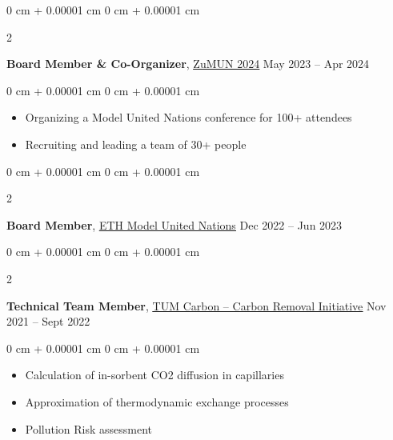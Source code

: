 \documentclass[10pt, letterpaper]{article}
\newenvironment{highlights}{
    \begin{itemize}[
        topsep=0.10 cm,
        parsep=0.10 cm,
        partopsep=0pt,
        itemsep=0pt,
        leftmargin=0 cm + 10pt
    ]
}{
    \end{itemize}
} %
\newenvironment{onecolentry}{
    \begin{adjustwidth}{
        0 cm + 0.00001 cm
    }{
        0 cm + 0.00001 cm
    }
}{
    \end{adjustwidth}
} %
\newenvironment{twocolentry}[2][]{
    \onecolentry
    \def\secondColumn{#2}
    \setcolumnwidth{\fill, 4.5 cm}
    \begin{paracol}{2}
}{
    \switchcolumn \raggedleft \secondColumn
    \end{paracol}
    \endonecolentry
} %
\begin{document}
         \vspace{0.2 cm}


         
        \begin{twocolentry}{
            May 2023 – Apr 2024
        }
            \textbf{Board Member \& Co-Organizer}, \href{https://zumun.ch/secretariat/}{\underline{ZuMUN 2024}}\end{twocolentry}
            \vspace{0.10 cm}
        \begin{onecolentry}
            \begin{highlights}
                \item Organizing a Model United Nations conference for 100+ attendees
                \item Recruiting and leading a team of 30+ people
            \end{highlights}
        \end{onecolentry}

        \vspace{0.2 cm}



          

        \vspace{0.2 cm}


        \begin{twocolentry}{
            Dec 2022 – Jun 2023
        }
            \textbf{Board Member}, \href{https://ethmun.org/}{\underline{ETH Model United Nations}}\end{twocolentry}



  
        \vspace{0.2 cm}

        \begin{twocolentry}{
            Nov 2021 – Sept 2022
        }
            \textbf{Technical Team Member}, \href{https://www.tumcarbon.com/}{\underline{TUM Carbon – Carbon Removal Initiative}}\end{twocolentry}

        \vspace{0.10 cm}
        \begin{onecolentry}
            \begin{highlights}
                \item Calculation of in-sorbent CO2 diffusion in capillaries
                \item Approximation of thermodynamic exchange processes
                \item Pollution Risk assessment
            \end{highlights}
        \end{onecolentry}
\end{document}
